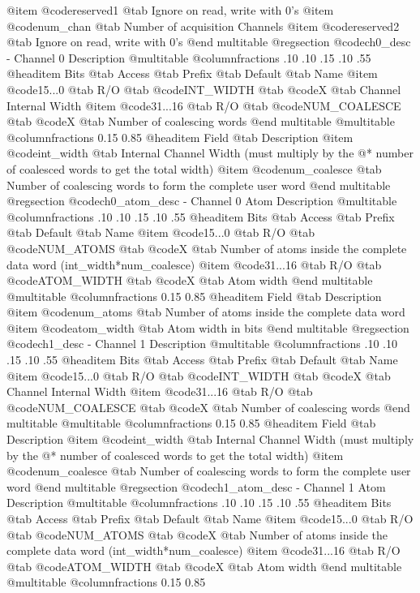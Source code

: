 @item @code{reserved1} @tab Ignore on read, write with 0's
@item @code{num_chan} @tab Number of acquisition Channels
@item @code{reserved2} @tab Ignore on read, write with 0's
@end multitable
@regsection @code{ch0_desc} - Channel 0 Description
@multitable @columnfractions .10 .10 .15 .10 .55
@headitem Bits @tab Access @tab Prefix @tab Default @tab Name
@item @code{15...0}
@tab R/O @tab
@code{INT_WIDTH}
@tab @code{X} @tab 
Channel Internal Width
@item @code{31...16}
@tab R/O @tab
@code{NUM_COALESCE}
@tab @code{X} @tab 
Number of coalescing words
@end multitable
@multitable @columnfractions 0.15 0.85
@headitem Field @tab Description
@item @code{int_width} @tab Internal Channel Width (must multiply by the @* number of coalesced words to get the total width)
@item @code{num_coalesce} @tab Number of coalescing words to form the complete user word
@end multitable
@regsection @code{ch0_atom_desc} - Channel 0 Atom Description
@multitable @columnfractions .10 .10 .15 .10 .55
@headitem Bits @tab Access @tab Prefix @tab Default @tab Name
@item @code{15...0}
@tab R/O @tab
@code{NUM_ATOMS}
@tab @code{X} @tab 
Number of atoms inside the complete data word (int_width*num_coalesce)
@item @code{31...16}
@tab R/O @tab
@code{ATOM_WIDTH}
@tab @code{X} @tab 
Atom width
@end multitable
@multitable @columnfractions 0.15 0.85
@headitem Field @tab Description
@item @code{num_atoms} @tab Number of atoms inside the complete data word
@item @code{atom_width} @tab Atom width in bits
@end multitable
@regsection @code{ch1_desc} - Channel 1 Description
@multitable @columnfractions .10 .10 .15 .10 .55
@headitem Bits @tab Access @tab Prefix @tab Default @tab Name
@item @code{15...0}
@tab R/O @tab
@code{INT_WIDTH}
@tab @code{X} @tab 
Channel Internal Width
@item @code{31...16}
@tab R/O @tab
@code{NUM_COALESCE}
@tab @code{X} @tab 
Number of coalescing words
@end multitable
@multitable @columnfractions 0.15 0.85
@headitem Field @tab Description
@item @code{int_width} @tab Internal Channel Width (must multiply by the @* number of coalesced words to get the total width)
@item @code{num_coalesce} @tab Number of coalescing words to form the complete user word
@end multitable
@regsection @code{ch1_atom_desc} - Channel 1 Atom Description
@multitable @columnfractions .10 .10 .15 .10 .55
@headitem Bits @tab Access @tab Prefix @tab Default @tab Name
@item @code{15...0}
@tab R/O @tab
@code{NUM_ATOMS}
@tab @code{X} @tab 
Number of atoms inside the complete data word (int_width*num_coalesce)
@item @code{31...16}
@tab R/O @tab
@code{ATOM_WIDTH}
@tab @code{X} @tab 
Atom width
@end multitable
@multitable @columnfractions 0.15 0.85

